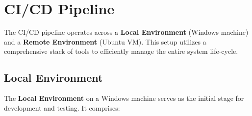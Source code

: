 \chapter{CI/CD Pipeline}

The CI/CD pipeline operates across a \textbf{Local Environment} (Windows machine) and a \textbf{Remote Environment} (Ubuntu VM). This setup utilizes a comprehensive stack of tools to efficiently manage the entire system life-cycle.

\section{Local Environment}

The \textbf{Local Environment} on a Windows machine serves as the initial stage for development and testing. It comprises:

